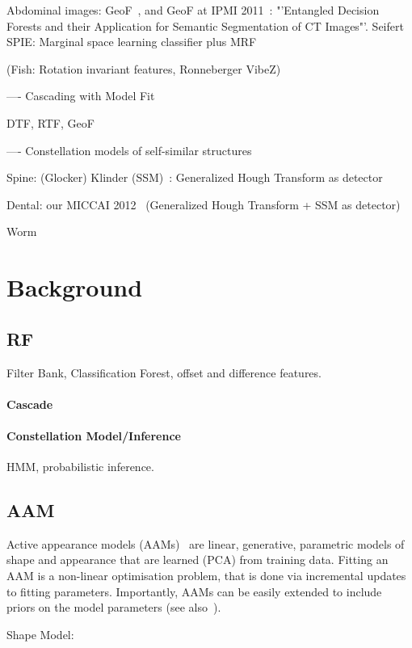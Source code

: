 \documentclass[10pt,twocolumn,letterpaper]{article}
\begin{document}
Abdominal images: GeoF~\cite{GeoForests2013}, and GeoF at IPMI 2011~\cite{CriminisiAbdominalIPMI2011}: "'Entangled Decision Forests and their Application for Semantic Segmentation of CT Images"'. Seifert SPIE: Marginal space learning classifier plus MRF~\cite{SeifertAnatomicalSPIE2009} 

(Fish: Rotation invariant features, Ronneberger VibeZ)

---- Cascading with Model Fit

DTF, RTF, GeoF

---- Constellation models of self-similar structures

Spine: (Glocker) Klinder (SSM)~\cite{Klinder2009471}: Generalized Hough Transform as detector

Dental: our MICCAI 2012~\cite{TeethMICCAI2012} (Generalized Hough Transform + SSM as detector)

Worm~\cite{WormMiccai2014}

\section{Background}

\subsection{RF}
Filter Bank, Classification Forest, offset and difference features. 

\paragraph{Cascade}

\paragraph{Constellation Model/Inference}
HMM, probabilistic inference.

\subsection{AAM}
Active appearance models (AAMs)~\cite{CootesAAM2001} are linear, generative, parametric models of shape and appearance that are learned (PCA) from training data.  Fitting an AAM is a non-linear optimisation problem, that is done via incremental updates to fitting parameters.  Importantly, AAMs can be easily extended to include priors on the model parameters (see also~\cite{BakerAAM2004}).  

Shape Model:
\end{document}
